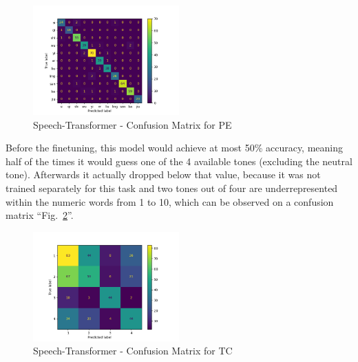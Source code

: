 \documentclass[conference]{IEEEtran}
\begin{document}
\begin{figure}[hbtp]
\centerline{\includegraphics[width=0.5\textwidth]{Figures/Fig_STPE.png}}
\caption{Speech-Transformer - Confusion Matrix for PE}
\label{fig_STPE} %
\end{figure}

Before the finetuning, this model would achieve at most 50\% accuracy, meaning half of the times it would guess one of the 4 available tones (excluding the neutral tone).
Afterwards it actually dropped below that value, because it was not trained separately for this task and two tones out of four are underrepresented within the numeric words from 1 to 10, which can be observed on a confusion matrix ``Fig.~\ref{fig_STTC}''.

\begin{figure}[hbtp]
    \centerline{\includegraphics[width=0.5\textwidth]{Figures/Fig_STTC.png}}
    \caption{Speech-Transformer - Confusion Matrix for TC}
    \label{fig_STTC}
\end{figure}
\end{document}
